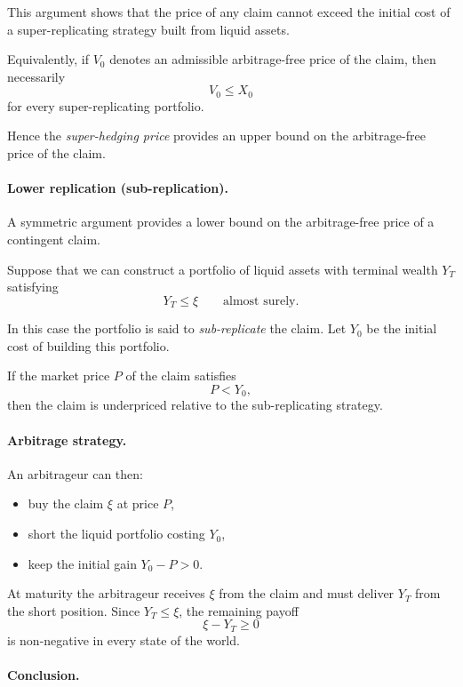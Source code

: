 \documentclass[11pt]{article}
\newcommand{\1}{\mathbf{1}}
\theoremstyle{plain}
\theoremstyle{definition}
\theoremstyle{remark}
\begin{document}
This argument shows that the price of any claim cannot exceed the initial
cost of a super-replicating strategy built from liquid assets.

Equivalently, if \(V_0\) denotes an admissible arbitrage-free price of the
claim, then necessarily
\[
V_0 \le X_0
\]
for every super-replicating portfolio.

Hence the \emph{super-hedging price} provides an upper bound on the
arbitrage-free price of the claim.


\paragraph{Lower replication (sub-replication).}

A symmetric argument provides a lower bound on the arbitrage-free price
of a contingent claim.

Suppose that we can construct a portfolio of liquid assets with terminal
wealth \(Y_T\) satisfying
\[
Y_T \le \xi
\qquad\text{almost surely.}
\]

In this case the portfolio is said to \emph{sub-replicate} the claim.
Let \(Y_0\) be the initial cost of building this portfolio.

If the market price \(P\) of the claim satisfies
\[
P < Y_0,
\]
then the claim is underpriced relative to the sub-replicating strategy.

\paragraph{Arbitrage strategy.}

An arbitrageur can then:
\begin{itemize}[leftmargin=1.4em]
\item buy the claim \(\xi\) at price \(P\),
\item short the liquid portfolio costing \(Y_0\),
\item keep the initial gain \(Y_0 - P > 0\).
\end{itemize}

At maturity the arbitrageur receives \(\xi\) from the claim and must
deliver \(Y_T\) from the short position.
Since \(Y_T \le \xi\), the remaining payoff
\[
\xi - Y_T \ge 0
\]
is non-negative in every state of the world.

\paragraph{Conclusion.}
\end{document}
